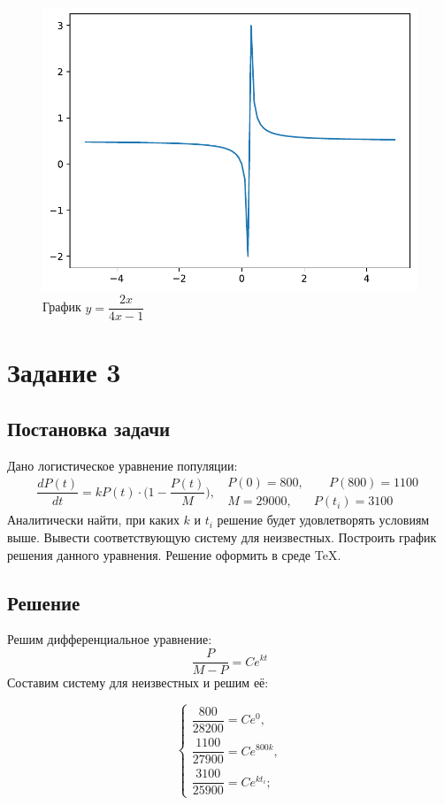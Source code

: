 \documentclass[a4paper, 14pt, fleqn]{extarticle}
\begin{document}
\begin{enumerate}
					\begin{figure}[H]
					   	\centering
					    	\includegraphics[width = .75\linewidth]{2.pdf}
						\caption[.] {График  \( y = \dfrac{2x}{4x-1} \)}
  					\end{figure}
			\end{enumerate}

	\pagebreak
	\section{Задание 3}
		\subsection{Постановка задачи}
			\noindent Дано логистическое уравнение популяции:
				\[ \dfrac{dP(t)}{dt} = kP(t) \cdot \bigg( 1- \dfrac{P(t)}{M}\bigg),\;\; \begin{matrix} P(0) = 800, &  \phantom{-}P(800) = 1100 \\ M = 29000, & P(t_i) = 3100 \end{matrix} \]
				Аналитически найти, при каких \(k\) и \(t_i\) решение будет удовлетворять условиям
				выше. Вывести соответствующую систему для неизвестных. Построить график
				решения данного уравнения. Решение оформить в среде \TeX .
		\subsection{Решение}
				\noindent Решим дифференциальное уравнение:
					\[ \dfrac{P}{M-P} = Ce^{kt} \]
				\noindent Составим систему для неизвестных и решим её:

					\[\begin {cases}
						\dfrac{800}{28200} = Ce^0, \\[7pt]
						\dfrac{1100}{27900} = Ce^{800k}, \\[7pt]
						\dfrac{3100}{25900} = Ce^{kt_i};
					\end {cases}\]
					
\end{document}
